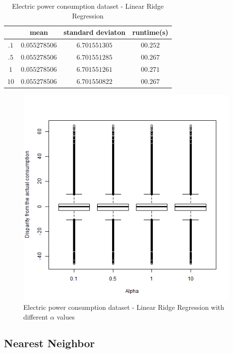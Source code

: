 \begin{table}[p]
	\begin{center}
		\begin{tabular}{|c|c|c|c|}
			\hline	\backslashbox{$\alpha$}{}&mean&standard deviaton&runtime(s)\\
\hline$.1$&$0.055278506$&$6.701551305$&$00.252$\\
\hline$.5$&$0.055278506$&$6.701551285$&$00.267$\\
\hline$1$&$0.055278506$&$6.701551261$&$00.271$\\
\hline$10$&$0.055278506$&$6.701550822$&$00.267$\\\hline
\end{tabular}
\end{center}
\caption{Electric power consumption dataset - Linear Ridge
Regression}
\label{ypmsd:table:ds3lrrresults}
\end{table}

\begin{figure}[p]
	\center
	\includegraphics[scale=\figurescaling]{figures/db3/lrralphavariats.png}
	\caption{Electric power consumption dataset - Linear Ridge Regression with
	different $\alpha$ values}
	\label{ypmsd:fig:db3:lrrresults}
\end{figure}

\subsection{Nearest Neighbor}

